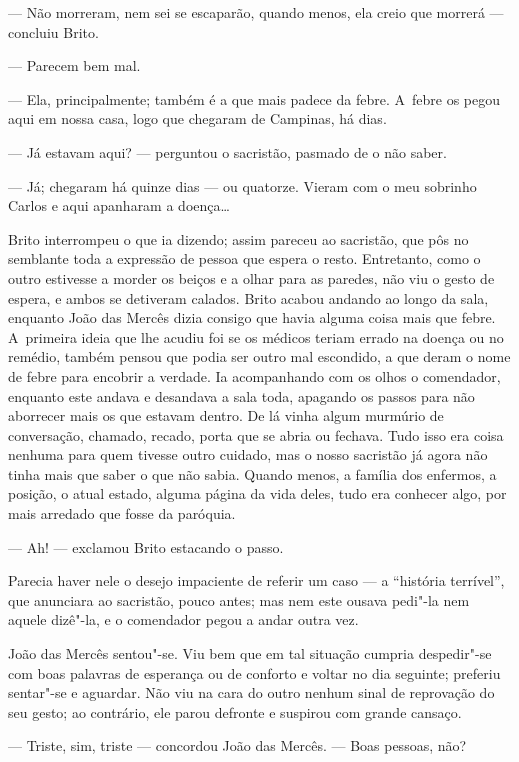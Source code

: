 \begin{linenumbers}
--- Não morreram, nem sei se escaparão, quando menos, ela creio que
morrerá --- concluiu Brito.

--- Parecem bem mal.

--- Ela, principalmente; também é a que mais padece da febre. A~febre os
pegou aqui em nossa casa, logo que chegaram de Campinas, há dias.

--- Já estavam aqui? --- perguntou o sacristão, pasmado de o não saber.

--- Já; chegaram há quinze dias --- ou quatorze. Vieram com o meu sobrinho
Carlos e aqui apanharam a doença\ldots{}

Brito interrompeu o que ia dizendo; assim pareceu ao sacristão, que pôs
no semblante toda a expressão de pessoa que espera o resto. Entretanto,
como o outro estivesse a morder os beiços e a olhar para as paredes, não
viu o gesto de espera, e ambos se detiveram calados. Brito acabou
andando ao longo da sala, enquanto João das Mercês dizia consigo que
havia alguma coisa mais que febre. A~primeira ideia que lhe acudiu foi
se os médicos teriam errado na doença ou no remédio, também pensou que
podia ser outro mal escondido, a que deram o nome de febre para encobrir
a verdade. Ia acompanhando com os olhos o comendador, enquanto este
andava e desandava a sala toda, apagando os passos para não aborrecer
mais os que estavam dentro. De lá vinha algum murmúrio de conversação,
chamado, recado, porta que se abria ou fechava. Tudo isso era coisa
nenhuma para quem tivesse outro cuidado, mas o nosso sacristão já agora
não tinha mais que saber o que não sabia. Quando menos, a família dos
enfermos, a posição, o atual estado, alguma página da vida deles, tudo
era conhecer algo, por mais arredado que fosse da paróquia.

--- Ah! --- exclamou Brito estacando o passo.

Parecia haver nele o desejo impaciente de referir um caso --- a
``história terrível'', que anunciara ao sacristão, pouco antes; mas nem
este ousava pedi"-la nem aquele dizê"-la, e o comendador pegou a andar
outra vez.

João das Mercês sentou"-se. Viu bem que em tal situação cumpria
despedir"-se com boas palavras de esperança ou de conforto e voltar no
dia seguinte; preferiu sentar"-se e aguardar. Não viu na cara do outro
nenhum sinal de reprovação do seu gesto; ao contrário, ele parou
defronte e suspirou com grande cansaço.

--- Triste, sim, triste --- concordou João das Mercês. --- Boas pessoas,
não?


\end{linenumbers}
